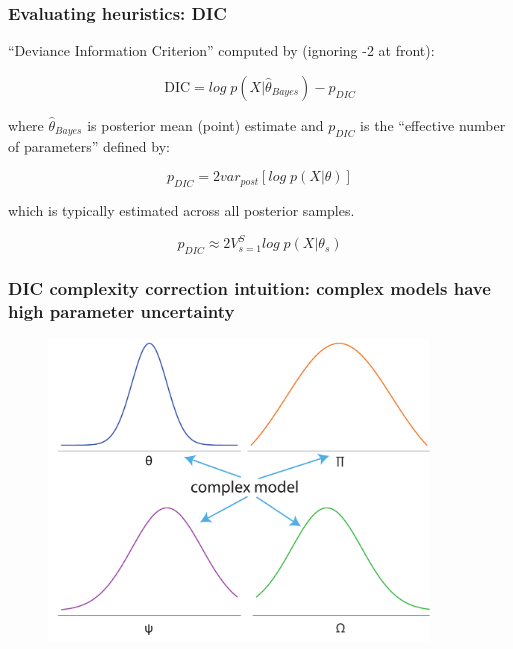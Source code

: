 \documentclass[handout]{beamer}
\begin{document}
\begin{frame}
	\frametitle{Evaluating heuristics: DIC}
	 ``Deviance Information Criterion'' computed by (ignoring -2 at front):
	
	\begin{equation}
	\text{DIC} = log \;p(X|\hat{\theta}_{Bayes}) - p_{DIC}
	\end{equation}
	
	 where $\hat{\theta}_{Bayes}$ is posterior mean (point) estimate and $p_{DIC}$ is the ``effective number of parameters'' defined by:
	
	\begin{equation}
	p_{DIC} = 2 var_{post} \left[log\; p (X|\theta)\right]
	\end{equation}
	
	which is typically estimated across all posterior samples.
	
	\begin{equation}
	p_{DIC} \approx 2 V_{s=1}^{S}log\; p (X|\theta_s)
	\end{equation}

\end{frame}

\begin{frame}
	\frametitle{DIC complexity correction intuition: complex models have high parameter uncertainty}
	
	\begin{figure}[ht]
		\centerline{\includegraphics[width=0.9\textwidth]{figures/lec7_overfit.pdf}}
	\end{figure}
	
\end{frame}
\end{document}
